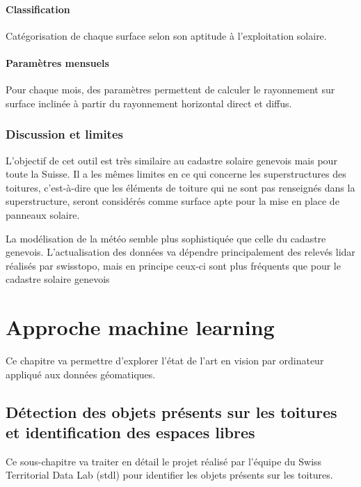 {\paragraph{Classification}
\par{Catégorisation de chaque surface selon son aptitude à l'exploitation solaire.}
\paragraph{Paramètres mensuels}
\par{Pour chaque mois, des paramètres permettent de calculer le rayonnement sur surface inclinée à partir du rayonnement horizontal direct et diffus.}
\subsubsection{Discussion et limites}
\par{L'objectif de cet outil est très similaire au cadastre solaire genevois mais pour toute la Suisse. Il a les mêmes limites en ce qui concerne les superstructures des toitures, c'est-à-dire que les éléments de toiture qui ne sont pas renseignés dans la superstructure, seront considérés comme surface apte pour la mise en place de panneaux solaire.}
\par{La modélisation de la météo semble plus sophistiquée que celle du cadastre genevois. L'actualisation des données va dépendre principalement des relevés \gls{lidar} réalisés par swisstopo, mais en principe ceux-ci sont plus fréquents que pour le cadastre solaire genevois}

\section{Approche machine learning}

\par{Ce chapitre va permettre d'explorer l'état de l'art en vision par ordinateur appliqué aux données géomatiques.}

\subsection{Détection des objets présents sur les toitures et identification des espaces libres}
\label{subsec:stdl_analyse}
\vspace{2mm}
\par{Ce sous-chapitre va traiter en détail le projet \cite{herny_detection_2024} réalisé par l'équipe du Swiss Territorial Data Lab (\acrshort{stdl}) pour identifier les objets présents sur les toitures.}

}
